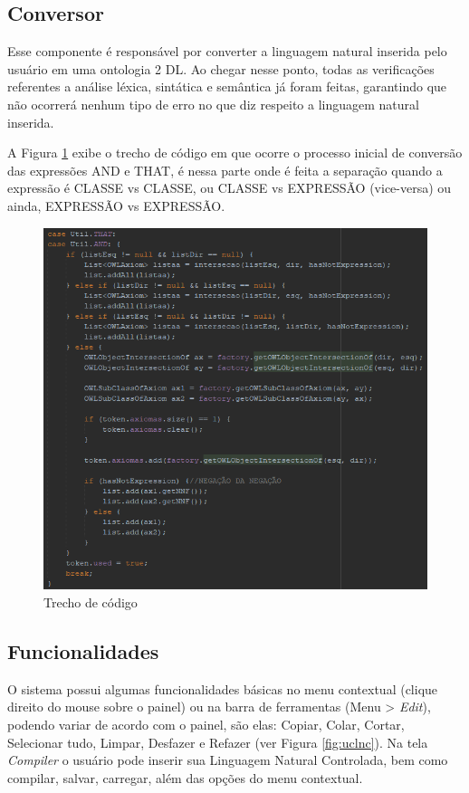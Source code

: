 \documentclass{bcc}
\begin{document}
\subsection{Conversor}

Esse componente é responsável por converter a linguagem natural inserida pelo usuário em uma ontologia 2 DL. Ao chegar nesse ponto, todas as verificações referentes a análise léxica, sintática e semântica já foram feitas, garantindo que não ocorrerá nenhum tipo de erro no que diz respeito a linguagem natural inserida.

A Figura \ref{fig:codigoConversor} exibe o trecho de código em que ocorre o processo inicial de conversão das expressões AND e THAT, é nessa parte onde é feita a separação quando a expressão é CLASSE vs CLASSE, ou CLASSE vs EXPRESSÃO (vice-versa) ou ainda, EXPRESSÃO vs EXPRESSÃO.

\begin{figure}[H]
\centering
\includegraphics[width=.8\textwidth]{Figuras/codigo_conversor_andthat.png}
\caption{Trecho de código} 
\label{fig:codigoConversor}
\end{figure}

\subsection{Funcionalidades}
O sistema possui algumas funcionalidades básicas no menu contextual (clique direito do mouse sobre o painel) ou na barra de ferramentas (Menu > \textit{Edit}), podendo variar de acordo com o painel, são elas: Copiar, Colar, Cortar, Selecionar tudo, Limpar, Desfazer e Refazer (ver Figura \ref{fig:uclnc}). Na tela \textit{Compiler} o usuário pode inserir sua Linguagem Natural Controlada, bem como compilar, salvar, carregar,  além das opções do menu contextual. 
\end{document}
